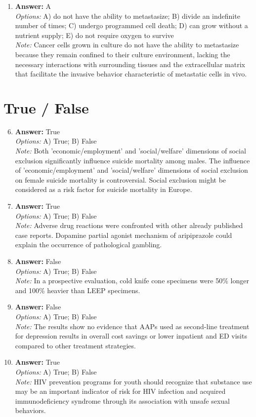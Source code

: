 \documentclass[12pt]{article}
\begin{document}
\begin{enumerate}[label=\arabic*.]
\item \textbf{Answer:} A
\\ \textit{Options:} A) do not have the ability to metastasize; B) divide an indefinite number of times; C) undergo programmed cell death; D) can grow without a nutrient supply; E) do not require oxygen to survive
\\ \textit{Note:} Cancer cells grown in culture do not have the ability to metastasize because they remain confined to their culture environment, lacking the necessary interactions with surrounding tissues and the extracellular matrix that facilitate the invasive behavior characteristic of metastatic cells in vivo.
\end{enumerate}

\section*{True / False}
\begin{enumerate}[label=\arabic*.]
\setcounter{enumi}{5}
\item \textbf{Answer:} True
\\ \textit{Options:} A) True; B) False
\\ \textit{Note:} Both 'economic/employment' and 'social/welfare' dimensions of social exclusion significantly influence suicide mortality among males. The influence of 'economic/employment' and 'social/welfare' dimensions of social exclusion on female suicide mortality is controversial. Social exclusion might be considered as a risk factor for suicide mortality in Europe.
\item \textbf{Answer:} True
\\ \textit{Options:} A) True; B) False
\\ \textit{Note:} Adverse drug reactions were confronted with other already published case reports. Dopamine partial agonist mechanism of aripiprazole could explain the occurrence of pathological gambling.
\item \textbf{Answer:} False
\\ \textit{Options:} A) True; B) False
\\ \textit{Note:} In a prospective evaluation, cold knife cone specimens were 50\% longer and 100\% heavier than LEEP specimens.
\item \textbf{Answer:} False
\\ \textit{Options:} A) True; B) False
\\ \textit{Note:} The results show no evidence that AAPs used as second-line treatment for depression results in overall cost savings or lower inpatient and ED visits compared to other treatment strategies.
\item \textbf{Answer:} True
\\ \textit{Options:} A) True; B) False
\\ \textit{Note:} HIV prevention programs for youth should recognize that substance use may be an important indicator of risk for HIV infection and acquired immunodeficiency syndrome through its association with unsafe sexual behaviors.
\end{enumerate}
\end{document}
